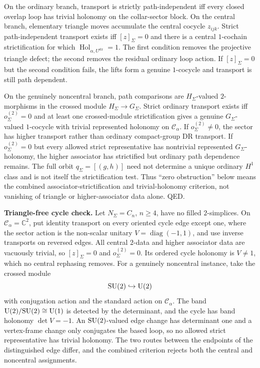 On the ordinary branch, transport is strictly path-independent iff every closed overlap loop has trivial holonomy on the collar-sector block. On the central branch, elementary triangle moves accumulate the central cocycle \(z_{ijk}\). Strict path-independent transport exists iff \([z]_\Sigma=0\) and there is a central \(1\)-cochain strictification for which \(\operatorname{Hol}_{\alpha,U^{\mathrm{str}}}=1\). The first condition removes the projective triangle defect; the second removes the residual ordinary loop action. If \([z]_\Sigma=0\) but the second condition fails, the lifts form a genuine \(1\)-cocycle and transport is still path dependent.

On the genuinely noncentral branch, path comparisons are \(H_\Sigma\)-valued \(2\)-morphisms in
the crossed module \(H_\Sigma\to G_\Sigma\). Strict ordinary transport exists iff
\(o^{(2)}_\Sigma=0\) and at least one crossed-module strictification gives a genuine
\(G_\Sigma\)-valued \(1\)-cocycle with trivial represented holonomy on \(\mathcal C_\alpha\). If
\(o^{(2)}_\Sigma\ne0\), the sector has higher transport rather than ordinary compact-group DR
transport. If \(o^{(2)}_\Sigma=0\) but every allowed strict representative has nontrivial
represented \(G_\Sigma\)-holonomy, the higher associator has strictified but ordinary path
dependence remains. The full orbit \(q_\Sigma=[(g,h)]\) need not determine a unique ordinary
\(H^1\) class and is not itself the strictification test. Thus
``zero obstruction'' below means the combined associator-strictification and trivial-holonomy
criterion, not vanishing of triangle or higher-associator data alone. QED.

\textbf{Triangle-free cycle check.} Let \(N_\Sigma=C_n\), \(n\ge4\), have no filled
\(2\)-simplices. On \(\mathcal C_\alpha=\mathbb C^2\), put identity transport on every oriented
cycle edge except one, where the sector action is the non-scalar unitary
\(V=\operatorname{diag}(-1,1)\), and use inverse transports on reversed edges. All central
\(2\)-data and higher associator data are vacuously trivial, so \([z]_\Sigma=0\) and
\(o^{(2)}_\Sigma=0\). Its ordered cycle holonomy is \(V\ne1\), which no central rephasing removes.
For a genuinely noncentral instance, take the crossed module
\[
\mathrm{SU}(2)\hookrightarrow\mathrm{U}(2)
\]
with conjugation action and the standard action on \(\mathcal C_\alpha\). The band
\(\mathrm{U}(2)/\mathrm{SU}(2)\cong\mathrm{U}(1)\) is detected by the determinant, and the cycle has band holonomy
\(\det V=-1\). An \(\mathrm{SU}(2)\)-valued edge change has determinant one and a vertex-frame change only
conjugates the based loop, so no allowed strict representative has trivial holonomy. The two routes
between the endpoints of the distinguished edge differ, and the combined criterion rejects both
the central and noncentral assignments.

